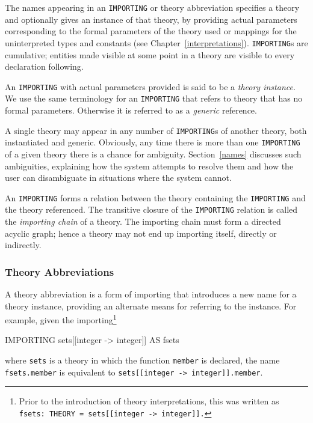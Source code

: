 The names appearing in an \texttt{IMPORTING} or theory abbreviation
specifies a theory and optionally gives an instance of that theory, by
providing actual parameters corresponding to the formal parameters of the
theory used or mappings for the uninterpreted types and constants (see
Chapter~\ref{interpretations}).  \texttt{IMPORTING}s are cumulative;
entities made visible at some point in a theory are visible to every
declaration following.

An \texttt{IMPORTING} with actual parameters provided is said to be a \emph{
theory instance}. We use the same terminology for
an \texttt{IMPORTING} that refers to theory that has no formal parameters.
Otherwise it is referred to as a \emph{generic}
reference.

A single theory may appear in any number of \texttt{IMPORTING}s of another
theory, both instantiated and generic.  Obviously, any time there is
more than one \texttt{IMPORTING} of a given theory there is a chance for
ambiguity.  Section~\ref{names} discusses such ambiguities, explaining
how the system attempts to resolve them and how the user can
disambiguate in situations where the system cannot.

An \texttt{IMPORTING} forms a relation between the theory containing the
\texttt{IMPORTING} and the theory referenced.  The transitive closure of
the \texttt{IMPORTING} relation is called the \emph{importing chain} of a
theory.  The importing chain must form a directed acyclic graph; hence a
theory may not end up importing itself, directly or indirectly.


\subsubsection{Theory Abbreviations}\label{theory-abbreviations}

A theory abbreviation is a form of importing that introduces a new name
for a theory instance, providing an alternate means for referring to the
instance.  For example, given the importing\footnote{Prior to the
introduction of theory interpretations, this was written as
\texttt{fsets:\ THEORY = sets[[integer -> integer]].}}
\begin{pvsex}
  IMPORTING sets[[integer -> integer]] AS fsets
\end{pvsex}
where \texttt{sets} is a theory in which the function \texttt{member} is
declared, the name \texttt{fsets.member} is equivalent to
\texttt{sets[[integer -> integer]].member}.


